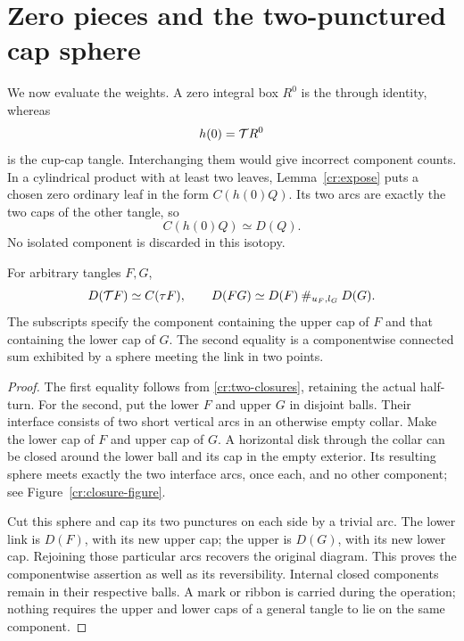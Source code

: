 \section{Zero pieces and the two-punctured cap sphere}\label{cr:zeros}

We now evaluate the weights. A zero integral box $R^0$ is the through identity, whereas
\[
                     h(0)=\mathcal T R^0
\]
is the cup-cap tangle. Interchanging them would give incorrect component counts. In a cylindrical product with at least two leaves, Lemma~\ref{cr:expose} puts a chosen zero ordinary leaf in the form $C(h(0)Q)$. Its two arcs are exactly the two caps of the other tangle, so
\begin{equation}\label{cr:zero-delete}
                         C(h(0)Q)\simeq D(Q).
\end{equation}
No isolated component is discarded in this isotopy.

\begin{lemma}\label{cr:cap-split}
For arbitrary tangles $F,G$,
\begin{equation}\label{cr:cap-rules}
 D(\mathcal T F)\simeq C(\tau F),\qquad
 D(FG)\simeq D(F)\mathbin{\#}_{u_F,l_G}D(G).
\end{equation}
The subscripts specify the component containing the upper cap of $F$ and that containing the lower cap of $G$. The second equality is a componentwise connected sum exhibited by a sphere meeting the link in two points.
\end{lemma}
\begin{proof}
The first equality follows from \eqref{cr:two-closures}, retaining the actual half-turn. For the second, put the lower $F$ and upper $G$ in disjoint balls. Their interface consists of two short vertical arcs in an otherwise empty collar. Make the lower cap of $F$ and upper cap of $G$. A horizontal disk through the collar can be closed around the lower ball and its cap in the empty exterior. Its resulting sphere meets exactly the two interface arcs, once each, and no other component; see Figure~\ref{cr:closure-figure}.

Cut this sphere and cap its two punctures on each side by a trivial arc. The lower link is $D(F)$, with its new upper cap; the upper is $D(G)$, with its new lower cap. Rejoining those particular arcs recovers the original diagram. This proves the componentwise assertion as well as its reversibility. Internal closed components remain in their respective balls. A mark or ribbon is carried during the operation; nothing requires the upper and lower caps of a general tangle to lie on the same component.
\end{proof}

